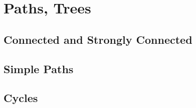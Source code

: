 \section{Paths, Trees}
\subsection{Connected and Strongly Connected}
\subsection{Simple Paths}
\subsection{Cycles}


\section{\problemhead}
